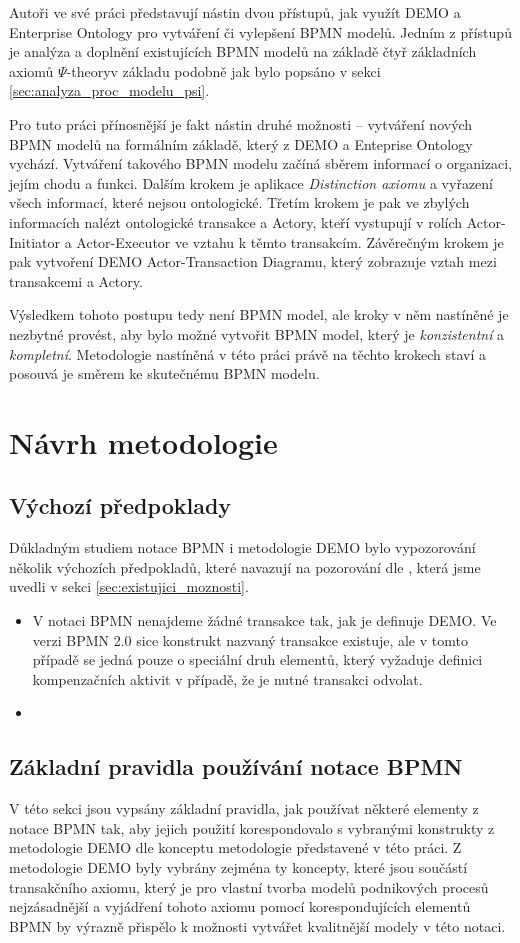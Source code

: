 \documentclass[]{article}
\newcommand{\ptheory}{$\Psi$-theory}
\begin{document}
Autoři ve své práci představují nástin dvou přístupů, jak využít DEMO a Enterprise Ontology pro vytváření či vylepšení BPMN modelů. Jedním z přístupů je analýza a doplnění existujících BPMN modelů na základě čtyř základních axiomů \ptheory v základu podobně jak bylo popsáno v sekci \ref{sec:analyza_proc_modelu_psi}. 

Pro tuto práci přínosnější je fakt nástin druhé možnosti – vytváření nových BPMN modelů na formálním základě, který z DEMO a Enteprise Ontology vychází. Vytváření takového BPMN modelu začíná sběrem informací o organizaci, jejím chodu a funkci. Dalším krokem je aplikace \textit{Distinction axiomu} a  vyřazení všech informací, které nejsou ontologické. Třetím krokem je pak ve zbylých informacích nalézt ontologické transakce a Actory, kteří vystupují v rolích Actor-Initiator a Actor-Executor ve vztahu k těmto transakcím. Závěrečným krokem je pak vytvoření DEMO Actor-Transaction Diagramu, který zobrazuje vztah mezi transakcemi a Actory. 

Výsledkem tohoto postupu tedy není BPMN model, ale kroky v něm nastíněné je nezbytné provést, aby bylo možné vytvořit BPMN model, který je \textit{konzistentní} a \textit{kompletní}. Metodologie nastíněná v této práci právě na těchto krokech staví a posouvá je směrem ke skutečnému BPMN modelu.

\section{Návrh metodologie}
\subsection{Výchozí předpoklady}
Důkladným studiem notace BPMN i metodologie DEMO bylo vypozorování několik výchozích předpokladů, které navazují na pozorování dle \cite{VanNuffel2009}, která jsme uvedli v sekci \ref{sec:existujici_moznosti}.

\begin{itemize}
\item V notaci BPMN nenajdeme žádné transakce tak, jak je definuje DEMO. Ve verzi BPMN 2.0 sice konstrukt nazvaný transakce existuje, ale v tomto případě se jedná pouze o speciální druh elementů, který vyžaduje definici kompenzačních aktivit v případě, že je nutné transakci odvolat.
\item
\end{itemize}

\subsection{Základní pravidla používání notace BPMN} \label{sec:zakladni_pravidla}
V této sekci jsou vypsány základní pravidla, jak používat některé elementy z notace BPMN tak, aby jejich použití korespondovalo s vybranými konstrukty z metodologie DEMO dle konceptu metodologie představené v této práci. Z metodologie DEMO byly vybrány zejména ty koncepty, které jsou součástí transakčního axiomu, který je pro vlastní tvorba modelů podnikových procesů nejzásadnější a vyjádření tohoto axiomu pomocí korespondujících elementů BPMN by výrazně přispělo k možnosti vytvářet kvalitnější modely v této notaci.
\end{document}
